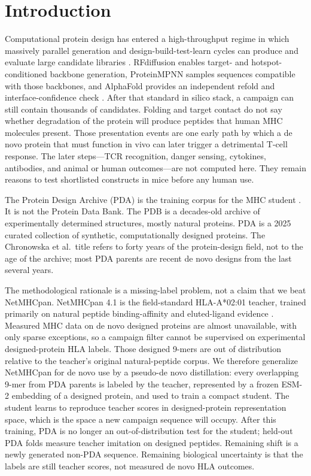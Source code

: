 \documentclass{article}
\begin{document}
\section{Introduction}
Computational protein design has entered a high-throughput regime in which massively parallel generation and design-build-test-learn cycles can produce and evaluate large candidate libraries \cite{silva2018miniproteins}. RFdiffusion enables target- and hotspot-conditioned backbone generation, ProteinMPNN samples sequences compatible with those backbones, and AlphaFold provides an independent refold and interface-confidence check \cite{watson2023rfdiffusion,dauparas2022proteinmpnn}. After that standard in silico stack, a campaign can still contain thousands of candidates. Folding and target contact do not say whether degradation of the protein will produce peptides that human MHC molecules present. Those presentation events are one early path by which a de novo protein that must function in vivo can later trigger a detrimental T-cell response. The later steps---TCR recognition, danger sensing, cytokines, antibodies, and animal or human outcomes---are not computed here. They remain reasons to test shortlisted constructs in mice before any human use.

The Protein Design Archive (PDA) is the training corpus for the MHC student \cite{chronowska2025pda}. It is not the Protein Data Bank. The PDB is a decades-old archive of experimentally determined structures, mostly natural proteins. PDA is a 2025 curated collection of synthetic, computationally designed proteins. The Chronowska et al.\ title refers to forty years of the protein-design field, not to the age of the archive; most PDA parents are recent de novo designs from the last several years.

The methodological rationale is a missing-label problem, not a claim that we beat NetMHCpan. NetMHCpan 4.1 is the field-standard HLA-A*02:01 teacher, trained primarily on natural peptide binding-affinity and eluted-ligand evidence \cite{reynisson2020netmhc}. Measured MHC data on de novo designed proteins are almost unavailable, with only sparse exceptions, so a campaign filter cannot be supervised on experimental designed-protein HLA labels. Those designed 9-mers are out of distribution relative to the teacher's original natural-peptide corpus. We therefore generalize NetMHCpan for de novo use by a pseudo-de novo distillation: every overlapping 9-mer from PDA parents is labeled by the teacher, represented by a frozen ESM-2 embedding of a designed protein, and used to train a compact student. The student learns to reproduce teacher scores in designed-protein representation space, which is the space a new campaign sequence will occupy. After this training, PDA is no longer an out-of-distribution test for the student; held-out PDA folds measure teacher imitation on designed peptides. Remaining shift is a newly generated non-PDA sequence. Remaining biological uncertainty is that the labels are still teacher scores, not measured de novo HLA outcomes.
\end{document}
